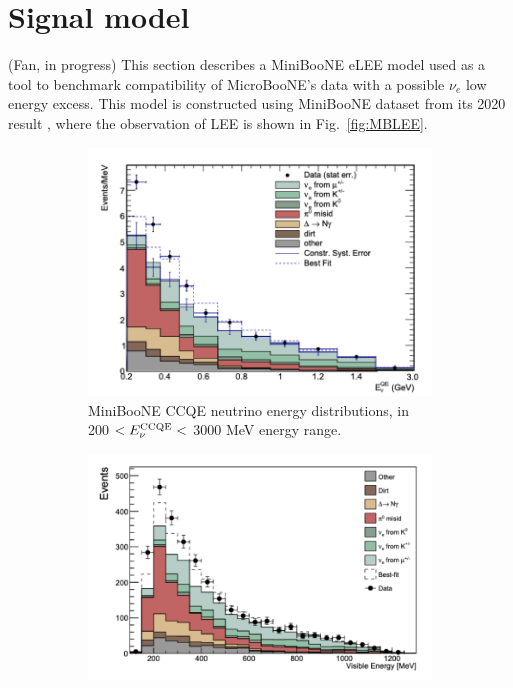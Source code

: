 \section{Signal model}
(Fan, in progress) This section describes a MiniBooNE eLEE model used as a tool to benchmark compatibility of MicroBooNE's data with a possible $\nu_e$ low energy excess. This model is constructed using MiniBooNE dataset from its 2020 result \cite{MiniBooNEpaper}, where the observation of LEE is shown in Fig.~\ref{fig:MBLEE}. 

\begin{figure}[H]
    \centering
    \begin{subfigure}{0.52\linewidth}
        \includegraphics[width=\linewidth]{technote/SignalModel/Figures/MB CCQE.png}
        \caption{MiniBooNE CCQE neutrino energy distributions, in 200 $< E_{\nu}^{\rm{CCQE}} <$ 3000 MeV energy range.}
    \end{subfigure}
    \begin{subfigure}{0.49\linewidth}
        \includegraphics[width=\linewidth]{technote/SignalModel/Figures/MB ShwKE.png}

\end{subfigure}
\end{figure}
